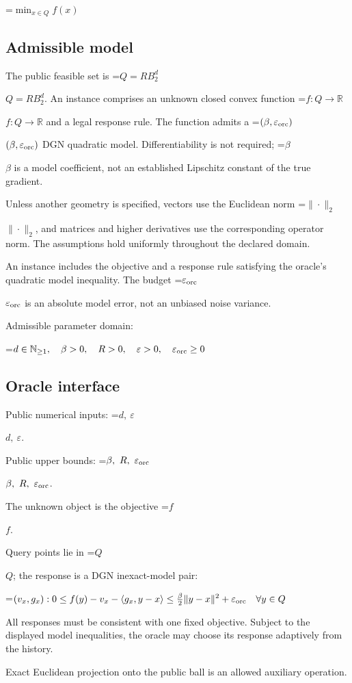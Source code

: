 \documentclass[10pt,a4paper]{article}
\newcommand{\AtlasMath}[1]{\par\begingroup\centering\setbox0=\hbox{$\displaystyle #1$}\ifdim\wd0>1.4\linewidth\typeout{ATLAS WIDE FORMULA: \the\wd0}\fi\ifdim\wd0>\linewidth\resizebox{\linewidth}{!}{\box0}\else\box0\fi\par\endgroup}
\newcommand{\AtlasInlineMath}[1]{\begingroup\setbox0=\hbox{$#1$}\ifdim\wd0>.4\linewidth\endgroup\AtlasMath{#1}\else\endgroup$#1$\fi}
\begin{document}
\AtlasMath{\min_{x\in Q}f(x)}


\subsection{Admissible model}
The public feasible set is \AtlasInlineMath{Q=RB_2^d}. An instance comprises an unknown closed convex function \AtlasInlineMath{f:Q\to\mathbb R} and a legal response rule. The function admits a \AtlasInlineMath{(\beta,\varepsilon_{\rm orc})} DGN quadratic model. Differentiability is not required; \AtlasInlineMath{\beta} is a model coefficient, not an established Lipschitz constant of the true gradient.

Unless another geometry is specified, vectors use the Euclidean norm \AtlasInlineMath{\|\cdot\|_2}, and matrices and higher derivatives use the corresponding operator norm. The assumptions hold uniformly throughout the declared domain.

An instance includes the objective and a response rule satisfying the oracle's quadratic model inequality. The budget \AtlasInlineMath{\varepsilon_{\rm orc}} is an absolute model error, not an unbiased noise variance.

Admissible parameter domain:


\AtlasMath{d\in\mathbb{N}_{\ge1},\quad \beta>0,\quad R>0,\quad \varepsilon>0,\quad \varepsilon_{\rm orc}\ge0}


\subsection{Oracle interface}
Public numerical inputs: \AtlasInlineMath{d,\ \varepsilon}.

Public upper bounds: \AtlasInlineMath{\beta,\ R,\ \varepsilon_{\rm orc}}.

The unknown object is the objective \AtlasInlineMath{f}.

Query points lie in \AtlasInlineMath{Q}; the response is a DGN inexact-model pair:


\AtlasMath{(v_x,g_x):0\le f(y)-v_x-\langle g_x,y-x\rangle\le\tfrac\beta2\|y-x\|^2+\varepsilon_{\rm orc}\quad\forall y\in Q}


All responses must be consistent with one fixed objective. Subject to the displayed model inequalities, the oracle may choose its response adaptively from the history.

Exact Euclidean projection onto the public ball is an allowed auxiliary operation.
\end{document}

